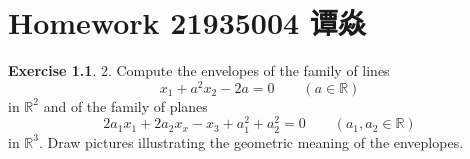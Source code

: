 \message{ !name(PDE-hw6-21935004-\unexpanded{谭焱}.tex)}\documentclass[a4paper]{book}
\makeatletter
\newcommand{\voidenvironment}[1]{%
  \expandafter\providecommand\csname env@#1@save@env\endcsname{}%
  \expandafter\providecommand\csname env@#1@process\endcsname{}%
  \@ifundefined{#1}{}{\RenewEnviron{#1}{}}%
}
\numberwithin{equation}{chapter}
\theoremstyle{definition}
\newtheorem{exc}[exm]{Exercise}
\makeatother
\begin{document}

\pagestyle{empty}
% 



\setcounter{chapter}{5}




\chapter{Homework 21935004 谭焱}



\begin{exc}
  2.  Compute the envelopes of the family of lines
  \begin{equation}
    \label{eq:6:1:1}
    x_1 + a^2 x_2 - 2a = 0 \qquad (a \in \mathbb{R})
  \end{equation}
  in $\mathbb{R}^2$ and of the family of planes
  \begin{equation}
    \label{eq:6:1:2}
    2 a_1 x_1 + 2 a_2 x_x - x_3 + a_1^2 + a_2^2 = 0 \qquad (a_1, a_2 \in \mathbb{R})
  \end{equation}
  in $\mathbb{R}^3$. Draw pictures illustrating the geometric meaning of the enveplopes.
\end{exc}
\end{document}
